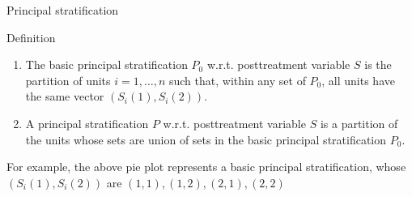 \documentclass[10pt]{beamer}
\begin{document}
\begin{frame}{Principal stratification}
\begin{block}{Definition}
\begin{enumerate}
    \item The basic principal stratification $P_0$ w.r.t. posttreatment variable $S$ is the partition of units $i = 1, \ldots, n$ such that, within any set of $P_0$, all units have the same vector $(S_i(1), S_i(2))$.

    \item A principal stratification $P$ w.r.t. posttreatment variable $S$ is a partition of the units whose sets are union of sets in the basic principal stratification $P_0$.
\end{enumerate}
\end{block}
\centering


\flushleft
For example, the above pie plot represents a basic principal stratification, whose $(S_i(1), S_i(2))$ are $(1,1), (1,2), (2,1), (2,2)$
\end{frame}
\end{document}
